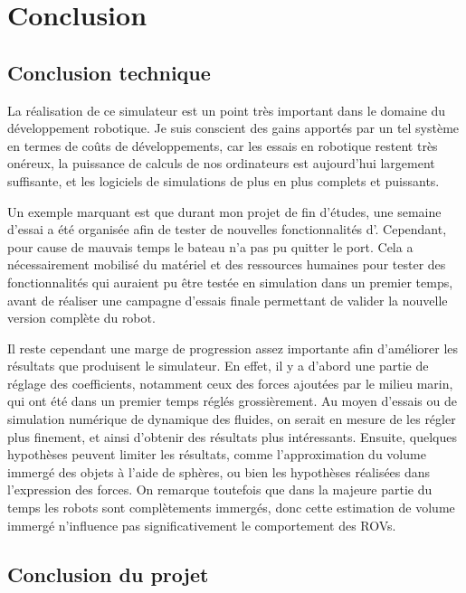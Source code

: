 \chapter{Conclusion}
\label{chapitre:conclusion}
	
	\section{Conclusion technique}

		La réalisation de ce simulateur est un point très important dans le domaine du développement robotique. Je suis conscient des gains apportés par un tel système en termes de coûts de développements, car les essais en robotique restent très onéreux, la puissance de calculs de nos ordinateurs est aujourd'hui largement suffisante, et les logiciels de simulations de plus en plus complets et puissants. 
		
		Un exemple marquant est que durant mon projet de fin d'études, une semaine d'essai a été organisée afin de tester de nouvelles fonctionnalités d'\argos{}. Cependant, pour cause de mauvais temps le bateau n'a pas pu quitter le port. Cela a nécessairement mobilisé du matériel et des ressources humaines pour tester des fonctionnalités qui auraient pu être testée en simulation dans un premier temps, avant de réaliser une campagne d'essais finale permettant de valider la nouvelle version complète du robot.

		Il reste cependant une marge de progression assez importante afin d'améliorer les résultats que produisent le simulateur. En effet, il y a d'abord une partie de réglage des coefficients, notamment ceux des forces ajoutées par le milieu marin, qui ont été dans un premier temps réglés grossièrement. Au moyen d'essais ou de simulation numérique de dynamique des fluides, on serait en mesure de les régler plus finement, et ainsi d'obtenir des résultats plus intéressants. Ensuite, quelques hypothèses peuvent limiter les résultats, comme l'approximation du volume immergé des objets à l'aide de sphères, ou bien les hypothèses réalisées dans l'expression des forces. On remarque toutefois que dans la majeure partie du temps les robots sont complètements immergés, donc cette estimation de volume immergé n'influence pas significativement le comportement des \gls{ROV}s. 
	
	\section{Conclusion du projet}

